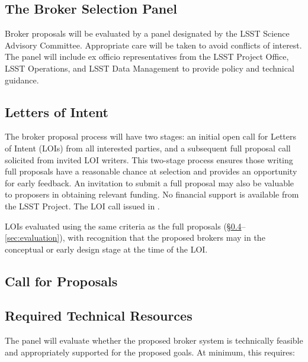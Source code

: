 \subsection{The Broker Selection Panel}

Broker proposals will be evaluated by a panel designated by the LSST Science Advisory Committee.  Appropriate care will be taken to avoid conflicts of interest.
The panel will include ex officio representatives from the LSST Project Office, LSST Operations, and LSST Data Management to provide policy and technical guidance.

\subsection{Letters of Intent} \label{sec:LOIs}

The broker proposal process will have two stages:
an initial open call for Letters of Intent (LOIs) from all interested parties, and a subsequent full proposal call solicited from invited LOI writers.
This two-stage process ensures those writing full proposals have a reasonable chance at selection and provides an opportunity for early feedback.
An invitation to submit a full proposal may also be valuable to proposers in obtaining relevant funding.
No financial support is available from the LSST Project.
The LOI call  issued in .

LOIs  evaluated using the same criteria as the full proposals (\S \ref{sec:resources}--\ref{sec:evaluation}), with recognition that the proposed brokers may  in the conceptual or early design stage at the time of the LOI.

\subsection{Call for Proposals} \label{sec:CfP}


\subsection{Required Technical Resources} \label{sec:resources}

The panel will evaluate whether the proposed broker system is technically feasible and appropriately supported for the proposed goals.
At minimum, this requires:

